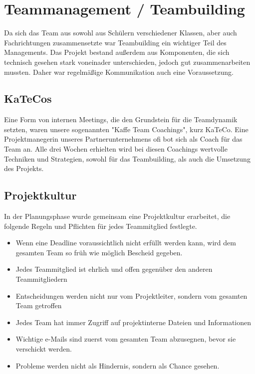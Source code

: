\section{Teammanagement / Teambuilding}
Da sich das Team aus sowohl aus Schülern verschiedener Klassen, aber auch Fachrichtungen
zusammensetzte war Teambuilding ein wichtiger Teil des Managements. Das Projekt bestand außerdem
aus Komponenten, die sich technisch gesehen stark voneinader unterschieden, jedoch gut zusammenarbeiten mussten.
Daher war regelmäßige Kommunikation auch eine Voraussetzung.

  \subsection{KaTeCos}
  Eine Form von internen Meetings, die den Grundstein für die Teamdynamik setzten, waren unsere
  sogenannten "Kaffe Team Coachings", kurz KaTeCo. Eine Projektmanegerin unseres Partnerunternehmens ofi
  bot sich als Coach für das Team an. Alle drei Wochen erhielten wird bei diesen Coachings wertvolle Techniken und
  Strategien, sowohl für das Teambuilding, als auch die Umsetzung des Projekts.

  \subsection{Projektkultur}
  In der Planungsphase wurde gemeinsam eine Projektkultur erarbeitet, die folgende Regeln und Pflichten
  für jedes Teammitglied festlegte.
  \begin{itemize}
    \item Wenn eine Deadline voraussichtlich nicht erfüllt werden kann, wird dem gesamten Team so früh wie möglich Bescheid gegeben.
    \item Jedes Teammitglied ist ehrlich und offen gegenüber den anderen Teammitgliedern
    \item Entscheidungen werden nicht nur vom Projektleiter, sondern vom gesamten Team getroffen
    \item Jedes Team hat immer Zugriff auf projektinterne Dateien und Informationen
    \item Wichtige e-Mails sind zuerst vom gesamten Team abzusegnen, bevor sie verschickt werden.
    \item Probleme werden nicht als Hindernis, sondern als Chance gesehen.
  \end{itemize}
